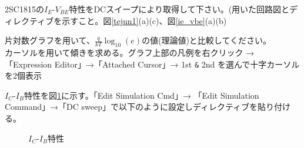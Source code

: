\begin{description}
  \setlength{\parskip}{0cm} %
  \setlength{\itemsep}{0cm} %
  \item[課題2] 2SC1815の$I_E$-$V_{BE}$特性をDCスイープにより取得して下さい。(用いた回路図とディレクティブを示すこと。図\ref{tejun1}(a)(c)、図\ref{ie_vbe}(a)(b)
  \item[任意課題4] 片対数グラフを用いて、$\frac{q}{kT}\log_{10}(e)$の値(理論値)と比較してください。\\
  カーソルを用いて傾きを求める。グラフ上部の凡例を右クリック →「Expression Editor」→「Attached Cursor」→ 1st \verb|&| 2nd を選んで十字カーソルを2個表示
\end{description}
\vspace{-0.5\baselineskip}
$I_C$-$I_B$特性を図\ref{ic_ib}に示す。「Edit Simulation Cmd」→ 「Edit Simulation Command」→「DC sweep」で以下のように設定しディレクティブを貼り付ける。
  \begin{figure}[htb]
    \begin{center}
    \caption{$I_C$-$I_B$特性}
    \label{ic_ib}
    \end{center}
  \end{figure}

